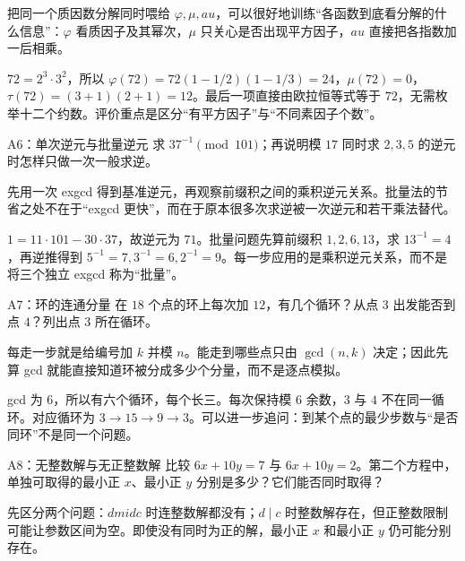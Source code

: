 \begin{pitfall}[讲解：先看这题到底在做什么]
把同一个质因数分解同时喂给 $\varphi,\mu,	au$，可以很好地训练“各函数到底看分解的什么信息”：$\varphi$ 看质因子及其幂次，$\mu$ 只关心是否出现平方因子，$	au$ 直接把各指数加一后相乘。
\end{pitfall}

\sol $72=2^3\cdot3^2$，所以 $\varphi(72)=72(1-1/2)(1-1/3)=24$，$\mu(72)=0$，$\tau(72)=(3+1)(2+1)=12$。最后一项直接由欧拉恒等式等于 $72$，无需枚举十二个约数。评价重点是区分“有平方因子”与“不同素因子个数”。


\begin{problem}{A6：单次逆元与批量逆元}
求 $37^{-1}\pmod{101}$；再说明模 $17$ 同时求 $2,3,5$ 的逆元时怎样只做一次一般求逆。
\end{problem}

\begin{pitfall}[讲解：先看这题到底在做什么]
先用一次 exgcd 得到基准逆元，再观察前缀积之间的乘积逆元关系。批量法的节省之处不在于“exgcd 更快”，而在于原本很多次求逆被一次逆元和若干乘法替代。
\end{pitfall}

\sol $1=11\cdot101-30\cdot37$，故逆元为 $71$。批量问题先算前缀积 $1,2,6,13$，求 $13^{-1}=4$，再逆推得到 $5^{-1}=7,3^{-1}=6,2^{-1}=9$。每一步应用的是乘积逆元关系，而不是将三个独立 exgcd 称为“批量”。


\begin{problem}{A7：环的连通分量}
在 $18$ 个点的环上每次加 $12$，有几个循环？从点 $3$ 出发能否到点 $4$？列出点 $3$ 所在循环。
\end{problem}

\begin{pitfall}[讲解：先看这题到底在做什么]
每走一步就是给编号加 $k$ 并模 $n$。能走到哪些点只由 $\gcd(n,k)$ 决定；因此先算 gcd 就能直接知道环被分成多少个分量，而不是逐点模拟。
\end{pitfall}

\sol gcd 为 $6$，所以有六个循环，每个长三。每次保持模 $6$ 余数，$3$ 与 $4$ 不在同一循环。对应循环为 $3\to15\to9\to3$。可以进一步追问：到某个点的最少步数与“是否同环”不是同一个问题。


\begin{problem}{A8：无整数解与无正整数解}
比较 $6x+10y=7$ 与 $6x+10y=2$。第二个方程中，单独可取得的最小正 $x$、最小正 $y$ 分别是多少？它们能否同时取得？
\end{problem}

\begin{pitfall}[讲解：先看这题到底在做什么]
先区分两个问题：$d
mid c$ 时连整数解都没有；$d\mid c$ 时整数解存在，但正整数限制可能让参数区间为空。即使没有同时为正的解，最小正 $x$ 和最小正 $y$ 仍可能分别存在。
\end{pitfall}


